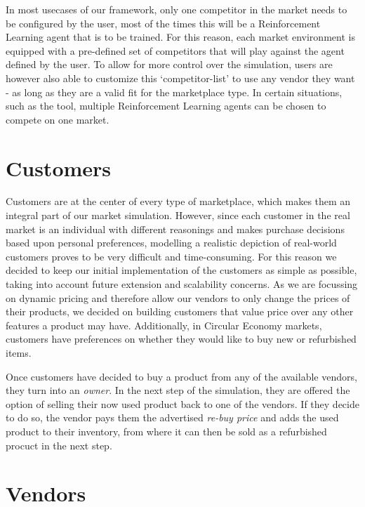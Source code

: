In most usecases of our framework, only one competitor in the market needs to be configured by the user, most of the times this will be a Reinforcement Learning agent that is to be trained. For this reason, each market environment is equipped with a pre-defined set of competitors that will play against the agent defined by the user. To allow for more control over the simulation, users are however also able to customize this `competitor-list' to use any vendor they want - as long as they are a valid fit for the marketplace type. In certain situations, such as the  tool, multiple Reinforcement Learning agents can be chosen to compete on one market.

\section{Customers}\label{sec:Customers}

Customers are at the center of every type of marketplace, which makes them an integral part of our market simulation. However, since each customer in the real market is an individual with different reasonings and makes purchase decisions based upon personal preferences, modelling a realistic depiction of real-world customers proves to be very difficult and time-consuming. For this reason we decided to keep our initial implementation of the customers as simple as possible, taking into account future extension and scalability concerns. As we are focussing on dynamic pricing and therefore allow our vendors to only change the prices of their products, we decided on building customers that value price over any other features a product may have. Additionally, in Circular Economy markets, customers have preferences on whether they would like to buy new or refurbished items.

Once customers have decided to buy a product from any of the available vendors, they turn into an \emph{owner}. In the next step of the simulation, they are offered the option of selling their now used product back to one of the vendors. If they decide to do so, the vendor pays them the advertised \emph{re-buy price} and adds the used product to their inventory, from where it can then be sold as a refurbished procuct in the next step.

\section{Vendors}\label{sec:ExplainVendors}

